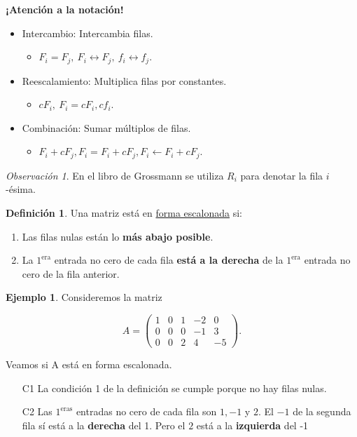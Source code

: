 \documentclass[12pt]{article}
\theoremstyle{plain}
\theoremstyle{definition}
\newtheorem*{Def}{Definición}       %
\newtheorem{Ex}[Th]{Ejemplo}           %
\theoremstyle{remark}
\newtheorem*{Rmk}{Observación}      %
\renewcommand{\:}{\colon}           %
\newcommand{\un}[1]{\underline{#1}}
\begin{document}
\begin{multicols}{2}
\textbf{¡Atención a la notación!}
\begin{itemize}
  \item Intercambio: Intercambia filas.
  \begin{itemize}
    \item $F_i=F_j,\ F_i\leftrightarrow F_j,\ f_i\leftrightarrow f_j$.
  \end{itemize}
  \item Reescalamiento: Multiplica filas por constantes.
  \begin{itemize}
    \item $cF_i,\ F_i=cF_i, cf_i$.
  \end{itemize}
  \item Combinación: Sumar múltiplos de filas.
  \begin{itemize}
    \item $F_i+cF_j, F_i=F_i+cF_j, F_i\leftarrow F_i+cF_j$.
  \end{itemize}
\end{itemize}
\begin{Rmk}
  En el libro de Grossmann se utiliza $R_i$ para denotar la fila $i$-ésima.
\end{Rmk}

\begin{Def}
Una matriz está en \un{forma escalonada} si:
\begin{enumerate}
  \item Las filas nulas están lo \textbf{más abajo posible}.
  \item La $1^{\text{era}}$ entrada no cero de cada fila \textbf{está a la derecha} de la $1^{\text{era}}$ entrada no cero de la fila anterior.
\end{enumerate}
\end{Def}

\begin{Ex}
Consideremos la matriz 

$$A=\begin{pmatrix}
  1&0&1&-2&0\\ 0&0&0&-1&3\\ 0&0&2&4&-5
\end{pmatrix}.$$

 Veamos si A está en forma escalonada.\par 
 
\begin{itemize}
  \item[C1] La condición 1 de la definición se cumple porque no hay filas nulas.
  \item[C2] Las $1^{\text{eras}}$ entradas no cero de cada fila son $1,-1$ y $2$. El $-1$ de la segunda fila sí está a la \textbf{derecha} del 1. Pero el $2$ está a la \textbf{izquierda} del -1
\end{itemize}


\end{Ex}
\end{multicols}
\end{document}
